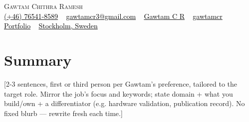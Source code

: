 \documentclass[letterpaper, 11pt]{article}
\newcommand{\vHeadingName}{3pt}    %
\newcommand{\vHeadingEnd}{-8pt}    %
\newcommand{\vSummaryTop}{2pt}     %
\newcommand{\vSummaryEnd}{-6pt}    %
\begin{document}
\begin{center}
    {\Huge \scshape Gawtam Chithra Ramesh} \\
    \vspace{\vHeadingName}
    \small
    { \href{tel:+46764518589}{{\faMobile*} \textcolor{black}{(+46) 76541-8589}} ~
    \href{mailto:gawtamcr3@gmail.com}{{\faPaperPlane} \textcolor{black}{gawtamcr3@gmail.com}} ~
    \href{https://linkedin.com/in/gawtamcr/}{{\faLinkedinIn} \textcolor{black}{Gawtam C R}} ~
    \href{https://github.com/gawtamcr}{{\faGithub} \textcolor{black}{gawtamcr}} ~
    \href{https://gawtamcr.github.io/}{{\faGlobe} \textcolor{black}{Portfolio}} ~
    \href{https://maps.google.com/?q=Stockholm,Sweden}{{\faMapMarker*} \textcolor{black}{Stockholm, Sweden}}
    }
    \vspace{\vHeadingEnd}
\end{center}

\section{\color{Blue}Summary}
\vspace{\vSummaryTop}
\small{[2-3 sentences, first or third person per Gawtam's preference, tailored to the target role. Mirror the
job's focus and keywords; state domain + what you build/own + a differentiator (e.g. hardware validation,
publication record). No fixed blurb — rewrite fresh each time.]}
\vspace{\vSummaryEnd}

\end{document}
